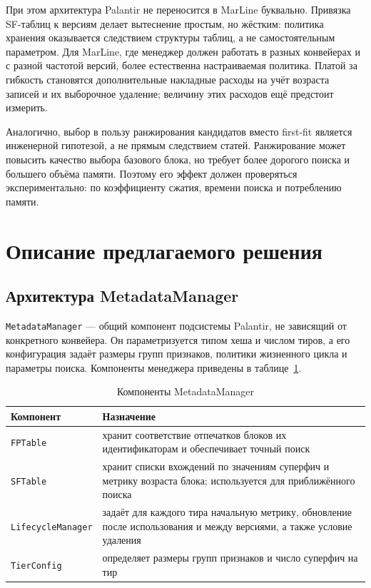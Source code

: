 \documentclass[a4paper]{article}
\begin{document}
При этом архитектура Palantir не переносится в MarLine буквально. Привязка
SF-таблиц к версиям делает вытеснение простым, но жёстким: политика хранения
оказывается следствием структуры таблиц, а не самостоятельным параметром.
Для MarLine, где менеджер должен работать в разных конвейерах и с разной
частотой версий, более естественна настраиваемая политика. Платой за гибкость
становятся дополнительные накладные расходы на учёт возраста записей и их
выборочное удаление; величину этих расходов ещё предстоит измерить.

Аналогично, выбор в пользу ранжирования кандидатов вместо first-fit является
инженерной гипотезой, а не прямым следствием статей. Ранжирование может повысить
качество выбора базового блока, но требует более дорогого поиска и большего
объёма памяти. Поэтому его эффект должен проверяться экспериментально:
по коэффициенту сжатия, времени поиска и потреблению памяти.


\section{Описание предлагаемого решения}

\subsection{Архитектура MetadataManager}

\texttt{MetadataManager} --- общий компонент подсистемы Palantir, не зависящий
от конкретного конвейера. Он параметризуется типом хеша и числом тиров, а его
конфигурация задаёт размеры групп признаков, политики жизненного цикла и
параметры поиска. Компоненты менеджера приведены в
таблице~\ref{tab:metadata-manager}.

\begin{table}[h]
\centering
\small
\begin{tabularx}{\textwidth}{@{}>{\raggedright\arraybackslash}p{}>{\raggedright\arraybackslash}X@{}}
\hline
Компонент & Назначение \\
\hline
\texttt{FPTable} & хранит соответствие отпечатков блоков их идентификаторам и обеспечивает точный поиск \\
\texttt{SFTable} & хранит списки вхождений по значениям суперфич и метрику возраста блока; используется для приближённого поиска \\
\texttt{LifecycleManager} & задаёт для каждого тира начальную метрику, обновление после использования и между версиями, а также условие удаления \\
\texttt{TierConfig} & определяет размеры групп признаков и число суперфич на тир \\
\hline
\end{tabularx}
\caption{Компоненты MetadataManager}
\label{tab:metadata-manager}
\end{table}
\end{document}
